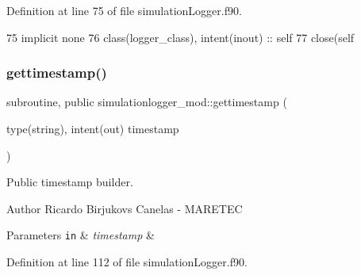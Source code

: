 Definition at line 75 of file simulation\+Logger.\+f90.


\begin{DoxyCode}
75     \textcolor{keywordtype}{implicit none}
76     \textcolor{keywordtype}{class}(logger\_class), \textcolor{keywordtype}{intent(inout)} :: self
77     \textcolor{keyword}{close}(self%
\end{DoxyCode}
\mbox{\label{namespacesimulationlogger__mod_abff1db7e1655cb59097146d78e650672}} 
\subsubsection{\texorpdfstring{gettimestamp()}{gettimestamp()}}
{\footnotesize\ttfamily subroutine, public simulationlogger\+\_\+mod\+::gettimestamp (\begin{DoxyParamCaption}\item[{type(string), intent(out)}]{timestamp }\end{DoxyParamCaption})}



Public timestamp builder. 

\begin{DoxyAuthor}{Author}
Ricardo Birjukovs Canelas -\/ M\+A\+R\+E\+T\+EC 
\end{DoxyAuthor}

\begin{DoxyParams}[1]{Parameters}
\mbox{\tt in}  & {\em timestamp} & \\
\hline
\end{DoxyParams}


Definition at line 112 of file simulation\+Logger.\+f90.


